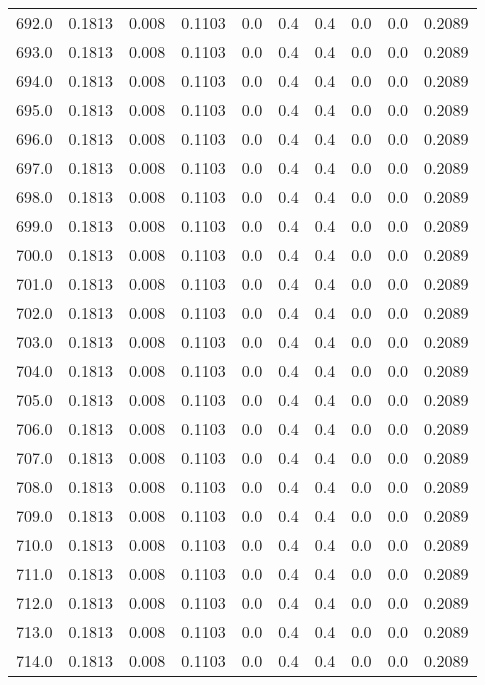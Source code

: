 \begin{longtable}{lrrrrrrrrr}
692.0 & 0.1813 & 0.008 & 0.1103 & 0.0 & 0.4 & 0.4 & 0.0 & 0.0 & 0.2089 \\
693.0 & 0.1813 & 0.008 & 0.1103 & 0.0 & 0.4 & 0.4 & 0.0 & 0.0 & 0.2089 \\
694.0 & 0.1813 & 0.008 & 0.1103 & 0.0 & 0.4 & 0.4 & 0.0 & 0.0 & 0.2089 \\
695.0 & 0.1813 & 0.008 & 0.1103 & 0.0 & 0.4 & 0.4 & 0.0 & 0.0 & 0.2089 \\
696.0 & 0.1813 & 0.008 & 0.1103 & 0.0 & 0.4 & 0.4 & 0.0 & 0.0 & 0.2089 \\
697.0 & 0.1813 & 0.008 & 0.1103 & 0.0 & 0.4 & 0.4 & 0.0 & 0.0 & 0.2089 \\
698.0 & 0.1813 & 0.008 & 0.1103 & 0.0 & 0.4 & 0.4 & 0.0 & 0.0 & 0.2089 \\
699.0 & 0.1813 & 0.008 & 0.1103 & 0.0 & 0.4 & 0.4 & 0.0 & 0.0 & 0.2089 \\
700.0 & 0.1813 & 0.008 & 0.1103 & 0.0 & 0.4 & 0.4 & 0.0 & 0.0 & 0.2089 \\
701.0 & 0.1813 & 0.008 & 0.1103 & 0.0 & 0.4 & 0.4 & 0.0 & 0.0 & 0.2089 \\
702.0 & 0.1813 & 0.008 & 0.1103 & 0.0 & 0.4 & 0.4 & 0.0 & 0.0 & 0.2089 \\
703.0 & 0.1813 & 0.008 & 0.1103 & 0.0 & 0.4 & 0.4 & 0.0 & 0.0 & 0.2089 \\
704.0 & 0.1813 & 0.008 & 0.1103 & 0.0 & 0.4 & 0.4 & 0.0 & 0.0 & 0.2089 \\
705.0 & 0.1813 & 0.008 & 0.1103 & 0.0 & 0.4 & 0.4 & 0.0 & 0.0 & 0.2089 \\
706.0 & 0.1813 & 0.008 & 0.1103 & 0.0 & 0.4 & 0.4 & 0.0 & 0.0 & 0.2089 \\
707.0 & 0.1813 & 0.008 & 0.1103 & 0.0 & 0.4 & 0.4 & 0.0 & 0.0 & 0.2089 \\
708.0 & 0.1813 & 0.008 & 0.1103 & 0.0 & 0.4 & 0.4 & 0.0 & 0.0 & 0.2089 \\
709.0 & 0.1813 & 0.008 & 0.1103 & 0.0 & 0.4 & 0.4 & 0.0 & 0.0 & 0.2089 \\
710.0 & 0.1813 & 0.008 & 0.1103 & 0.0 & 0.4 & 0.4 & 0.0 & 0.0 & 0.2089 \\
711.0 & 0.1813 & 0.008 & 0.1103 & 0.0 & 0.4 & 0.4 & 0.0 & 0.0 & 0.2089 \\
712.0 & 0.1813 & 0.008 & 0.1103 & 0.0 & 0.4 & 0.4 & 0.0 & 0.0 & 0.2089 \\
713.0 & 0.1813 & 0.008 & 0.1103 & 0.0 & 0.4 & 0.4 & 0.0 & 0.0 & 0.2089 \\
714.0 & 0.1813 & 0.008 & 0.1103 & 0.0 & 0.4 & 0.4 & 0.0 & 0.0 & 0.2089 \\

\end{longtable}
